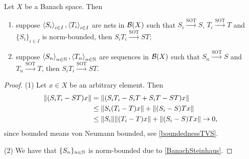 \begin{proposition}
Let $X$ be a Banach space. Then
\begin{enumerate}
\item suppose $\left\langle S_i \right\rangle_{i\in I}, \left\langle T_i \right\rangle_{i\in I}$ are nets in $\operatorname{\mathcal{B}}(X)$ such that $S_i \overset{\text{SOT}}{\longrightarrow} S$, $T_i \overset{\text{SOT}}{\longrightarrow} T$ and $\{S_i\}_{i\in I}$ is norm-bounded, then $S_iT_i \overset{\text{SOT}}{\longrightarrow} ST$;
\item suppose $\left\langle S_n \right\rangle_{n\in \mathbb{N}}, \left\langle T_n \right\rangle_{n\in \mathbb{N}}$ are sequences in $\operatorname{\mathcal{B}}(X)$ such that $S_n \overset{\text{SOT}}{\longrightarrow} S$ and $T_n \overset{\text{SOT}}{\longrightarrow} T$, then $S_iT_i \overset{\text{SOT}}{\longrightarrow} ST$.
\end{enumerate}
\end{proposition}
\begin{proof}
(1) Let $x\in X$ be an arbitrary element. Then
\begin{align*}
\lVert(S_iT_i - ST)x\rVert &= \lVert(S_iT_i - S_iT + S_iT - ST)x\rVert \\
&\leq \lVert S_i(T_i - T)x\rVert + \lVert(S_i - S)Tx\rVert \\
&\leq \lVert S_i\rVert\lVert(T_i - T)x\rVert + \lVert(S_i - S)Tx\rVert \to 0,
\end{align*}
since bounded means von Neumann bounded, see \ref{boundednessTVS}.

(2) We have that $\{S_n\}_{n\in \mathbb{N}}$ is norm-bounded due to \ref{BanachSteinhaus}.
\end{proof}

